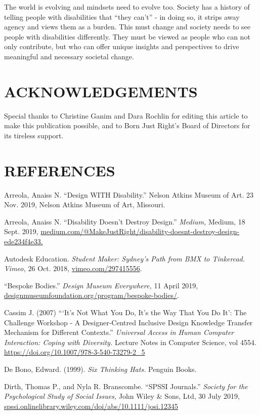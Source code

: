 \documentclass[11.5pt]{sig-alternate} %
\begin{document}
\begin{large}
The world is evolving and mindsets need to evolve too. Society has a history of telling people with disabilities that “they can’t” - in doing so, it strips away agency and views them as a burden. This must change and society needs to see people with disabilities differently. They must be viewed as people who can not only contribute, but who can offer unique insights and perspectives to drive meaningful and necessary societal change.

\section*{ACKNOWLEDGEMENTS}

Special thanks to Christine Ganim and Dara Rochlin for editing this article to make this publication possible, and to Born Just Right’s Board of Directors for its tireless support.

\end{large}
\clearpage
\section*{REFERENCES}\par 

\leftskip 0.25in
\parindent -0.25in 

Arreola, Anaiss N. “Design WITH Disability.” Nelson Atkins Museum of Art. 23 Nov. 2019, Nelson Atkins Museum of Art, Missouri.

Arreola, Anaiss N. “Disability Doesn't Destroy Design.” \textit{Medi\-um,} Medium, 18 Sept. 2019, \url{medium.com/@MakeJustRight/disability-doesnt-destroy-design-ede234f4e33.}

Autodesk Education. \textit{Student Maker: Sydney's Path from BMX to Tinkercad. Vimeo,} 26 Oct. 2018, \url{vimeo.com/297415556}.

“Bespoke Bodies.” \textit{Design Museum Everywhere,} 11 April 2019, \url{designmuseumfoundation.org/program/bespoke-bodies/}.

Cassim J. (2007) “‘It’s Not What You Do, It’s the Way That You Do It’: The Challenge Workshop - A Designer-Centred Inclusive Design Knowledge Transfer Mechanism for Different Contexts.” \textit{Universal Access in Human Computer Interaction: Coping with Diversity.} Lecture Notes in Computer Science, vol 4554. \url{https://doi.org/10.1007/978-3-540-73279-2\_5}

De Bono, Edward. (1999). \textit{Six Thinking Hats.} Penguin Books.

Dirth, Thomas P., and Nyla R. Branscombe. “SPSSI Journals.” \textit{Society for the Psychological Study of Social Issues,} John Wiley \& Sons, Ltd, 30 July 2019, \url{spssi.onlinelibrary.wiley.com/doi/abs/10.1111/josi.12345}
\end{document}

